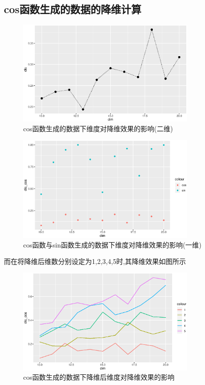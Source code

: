 \subsection{cos函数生成的数据的降维计算}
\begin{figure}[H]
    \centering
    \includegraphics[width=0.8\textwidth]{image/cos_save.eps}
    \caption{cos函数生成的数据下维度对降维效果的影响(二维)}
\end{figure}

\begin{figure}[H]
    \centering
    \includegraphics[width=0.8\textwidth]{image/compare_save_one.eps}
    \caption{cos函数与sin函数生成的数据下维度对降维效果的影响(一维)}
\end{figure}

而在将降维后维数分别设定为1,2,3,4,5时,其降维效果如图所示
\begin{figure}[H]
    \centering
    \includegraphics[width=0.8\textwidth]{image/compare_dim_save.eps}
    \caption{cos函数生成的数据下降维后维度对降维效果的影响}
\end{figure}
